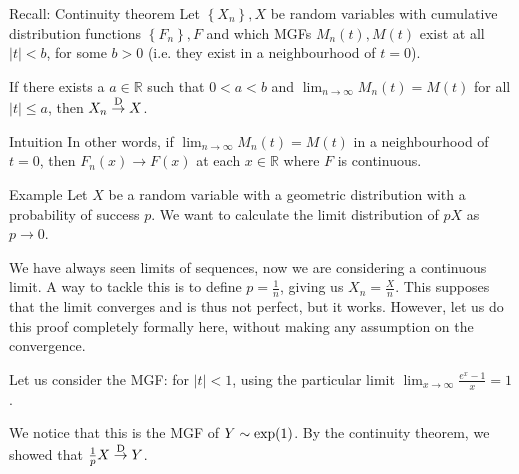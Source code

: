 \documentclass[a4paper]{article}
\begin{document}
\begin{parag}{Recall: Continuity theorem}
    Let $\left\{X_n\right\}, X$ be random variables with cumulative distribution functions $\left\{F_n\right\}, F$ and which MGFs $M_n\left(t\right), M\left(t\right)$ exist at all $\left|t\right| < b$, for some $b > 0$ (i.e. they exist in a neighbourhood of $t = 0$).

    If there exists a $a \in \mathbb{R}$ such that $0 < a < b$ and $\lim_{n \to \infty} M_n\left(t\right) = M\left(t\right)$ for all $\left|t\right| \leq a$, then $X_n \over{\to}{D} X$.
    
    \begin{subparag}{Intuition}
        In other words, if $\lim_{n \to \infty} M_n\left(t\right) = M\left(t\right)$ in a neighbourhood of $t = 0$, then $F_n\left(x\right) \to F\left(x\right)$ at each $x \in \mathbb{R}$ where $F$ is continuous. 
    \end{subparag}
\end{parag}

\begin{parag}{Example}
    Let $X$ be a random variable with a geometric distribution with a probability of success $p$. We want to calculate the limit distribution of $pX$ as $p \to 0$.

    We have always seen limits of sequences, now we are considering a continuous limit. A way to tackle this is to define $p = \frac{1}{n}$, giving us $X_n = \frac{X}{n}$. This supposes that the limit converges and is thus not perfect, but it works. However, let us do this proof completely formally here, without making any assumption on the convergence.

    Let us consider the MGF: 
    for $\left|t\right| < 1$, using the particular limit $\lim_{x \to \infty} \frac{e^{x} - 1}{x} = 1$.
    
    We notice that this is the MGF of $Y \followsdistr \exp\left(1\right)$. By the continuity theorem, we showed that $\frac{1}{p}X \over{\to}{D} Y$.
\end{parag}
\end{document}
